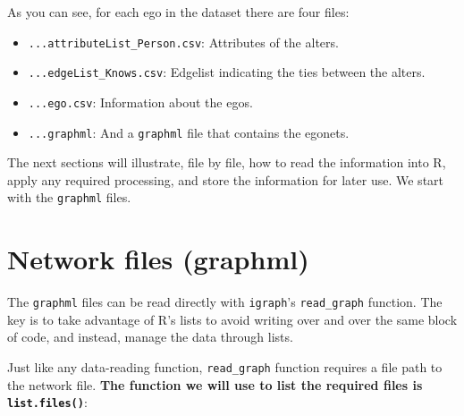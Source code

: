 \documentclass[
]{book}
\begin{document}
As you can see, for each ego in the dataset there are four files:

\begin{itemize}
\item
  \texttt{...attributeList\_Person.csv}: Attributes of the alters.
\item
  \texttt{...edgeList\_Knows.csv}: Edgelist indicating the ties between the alters.
\item
  \texttt{...ego.csv}: Information about the egos.
\item
  \texttt{...graphml}: And a \texttt{graphml} file that contains the egonets.
\end{itemize}

The next sections will illustrate, file by file, how to read the information into R, apply any required processing, and store the information for later use. We start with the \texttt{graphml} files.

\hypertarget{network-files-graphml}{%
\section{Network files (graphml)}\label{network-files-graphml}}

The \texttt{graphml} files can be read directly with \texttt{igraph}'s \texttt{read\_graph} function. The key is to take advantage of R's lists to avoid writing over and over the same block of code, and instead, manage the data through lists.

Just like any data-reading function, \texttt{read\_graph} function requires a file path to the network file. \textbf{The function we will use to list the required files is \texttt{list.files()}}:
\end{document}

